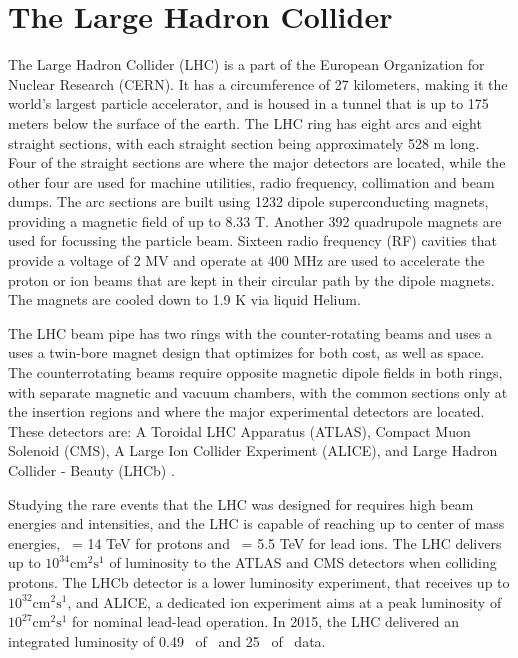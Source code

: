 
\section{The Large Hadron Collider}
The Large Hadron Collider (LHC) is a part of the European Organization for Nuclear Research (CERN).
It has a circumference of 27 kilometers, making it the world's largest particle accelerator, and is housed in a tunnel that is up to 175 meters below the surface of the earth.
The LHC ring has eight arcs and eight straight sections, with each straight section being approximately 528 m long.
Four of the straight sections are where the major detectors are located, while the other four are used for machine utilities, radio frequency, collimation and beam dumps.
The arc sections are built using 1232 dipole superconducting magnets, providing a magnetic field of up to 8.33 T.
Another 392 quadrupole magnets are used for focussing the particle beam.
Sixteen radio frequency (RF) cavities that provide a voltage of 2 MV and operate at 400 MHz are used to accelerate the proton or ion beams that are kept in their circular path by the dipole magnets.
The magnets are cooled down to 1.9 K via liquid Helium.

The LHC beam pipe has two rings with the counter-rotating beams and uses a uses a twin-bore magnet design that optimizes for both cost, as well as space.
The counterrotating beams require opposite magnetic dipole fields in both rings, with separate magnetic and vacuum chambers, with the common sections only at the insertion regions and where the major experimental detectors are located.
These detectors are: A Toroidal LHC Apparatus (ATLAS), Compact Muon Solenoid (CMS), A Large Ion Collider Experiment (ALICE), and Large Hadron Collider - Beauty (LHCb) \cite{Evans:2008zzb}.

Studying the rare events that the LHC was designed for requires high beam energies and intensities, and the LHC is capable of reaching up to center of mass energies, \sqrts\ = 14 TeV for protons and \sqrtsnn\ = 5.5 TeV for lead ions.
The LHC delivers up to $10^{34} \mathrm{cm}^2\mathrm{s}^1$ of luminosity to the ATLAS and CMS detectors when colliding protons.
The LHCb detector is a lower luminosity experiment, that receives up to $10^{32} \mathrm{cm}^2\mathrm{s}^1$, and ALICE, a dedicated ion experiment aims at a peak luminosity of $10^{27} \mathrm{cm}^2\mathrm{s}^1$ for nominal lead-lead operation.
In 2015, the LHC delivered an integrated luminosity of 0.49 \pb\ of \pbpb\ and 25 \pb\ of \pp\ data.

